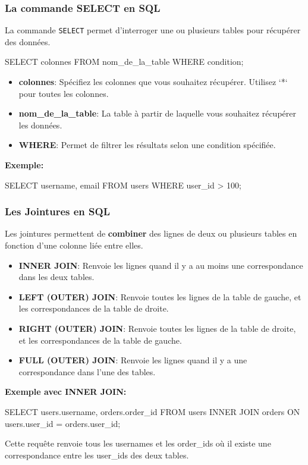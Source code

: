 \begin{frame}[fragile]
  \frametitle{La commande SELECT en SQL}

  La commande \texttt{SELECT} permet d'interroger une ou plusieurs tables pour récupérer des données.

  \begin{semiverbatim}
SELECT colonnes
FROM nom\_de\_la\_table
WHERE condition;
  \end{semiverbatim}

  \begin{itemize}
    \item \textbf{colonnes}: Spécifiez les colonnes que vous souhaitez récupérer. Utilisez `*` pour toutes les colonnes.
    \item \textbf{nom\_de\_la\_table}: La table à partir de laquelle vous souhaitez récupérer les données.
    \item \textbf{WHERE}: Permet de filtrer les résultats selon une condition spécifiée.
  \end{itemize}

  \textbf{Exemple:}
  \begin{semiverbatim}
SELECT username, email
FROM users
WHERE user\_id > 100;
  \end{semiverbatim}

\end{frame}


\begin{frame}[fragile]
  \frametitle{Les Jointures en SQL}

  Les jointures permettent de \textbf{combiner} des lignes de deux ou plusieurs tables en fonction d'une colonne liée entre elles.

  \begin{itemize}
    \item \textbf{INNER JOIN}: Renvoie les lignes quand il y a au moins une correspondance dans les deux tables.
    \item \textbf{LEFT (OUTER) JOIN}: Renvoie toutes les lignes de la table de gauche, et les correspondances de la table de droite.
    \item \textbf{RIGHT (OUTER) JOIN}: Renvoie toutes les lignes de la table de droite, et les correspondances de la table de gauche.
    \item \textbf{FULL (OUTER) JOIN}: Renvoie les lignes quand il y a une correspondance dans l'une des tables.
  \end{itemize}

  \textbf{Exemple avec INNER JOIN:}
  \begin{semiverbatim}
SELECT users.username, orders.order\_id
FROM users
INNER JOIN orders ON users.user\_id = orders.user\_id;
  \end{semiverbatim}

  Cette requête renvoie tous les usernames et les order\_ids où il existe une correspondance entre les user\_ids des deux tables.

\end{frame}

